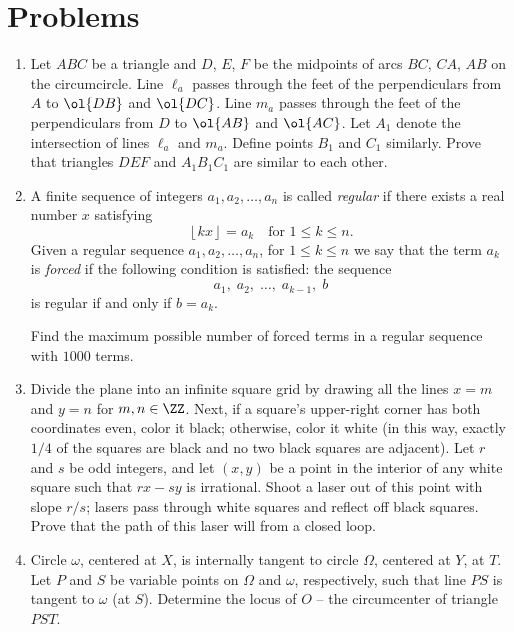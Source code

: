\documentclass[11pt]{scrartcl}
\begin{document}
\section{Problems}
\begin{enumerate}[\bfseries 1.]
\item %
Let $ABC$ be a triangle and $D$, $E$, $F$ be the midpoints of arcs $BC$, $CA$, $AB$ on the circumcircle.
Line $\ell_a$ passes through the feet of the perpendiculars
from $A$ to $\ol{DB}$ and $\ol{DC}$.
Line $m_a$ passes through the feet of the perpendiculars from $D$ to $\ol{AB}$ and $\ol{AC}$.
Let $A_1$ denote the intersection of lines $\ell_a$ and $m_a$.
Define points $B_1$ and $C_1$ similarly.
Prove that triangles $DEF$ and $A_1B_1C_1$ are similar to each other.

\item %
A finite sequence of integers $a_1, a_2, \dots, a_n$ is called
\emph{regular} if there exists a real number $x$ satisfying
\[ \left\lfloor kx \right\rfloor = a_k \quad \text{for } 1 \le k \le n. \]
Given a regular sequence $a_1, a_2, \dots, a_n$, for $1 \le k \le n$ we say that
the term $a_k$ is \emph{forced} if the following condition is satisfied:
the sequence \[ a_1, \; a_2, \; \dots, \; a_{k-1}, \; b \]
is regular if and only if $b = a_k$.

Find the maximum possible number of forced terms
in a regular sequence with $1000$ terms.

\item %
Divide the plane into an infinite square grid by drawing
all the lines $x=m$ and $y=n$ for $m,n \in \ZZ$.
Next, if a square's upper-right corner has both coordinates even, color it black;
otherwise, color it white (in this way, exactly $1/4$ of the squares are black
and no two black squares are adjacent).
Let $r$ and $s$ be odd integers,
and let $(x,y)$ be a point in the interior of any white square
such that $rx-sy$ is irrational.
Shoot a laser out of this point with slope $r/s$;
lasers pass through white squares and reflect off black squares.
Prove that the path of this laser will from a closed loop.

\item %
Circle $\omega$, centered at $X$, is internally tangent to circle $\Omega$,
centered at $Y$, at $T$.
Let $P$ and $S$ be variable points on $\Omega$ and $\omega$,
respectively, such that line $PS$ is tangent to $\omega$ (at $S$).
Determine the locus of $O$ -- the circumcenter of triangle $PST$.


\end{enumerate}
\end{document}

